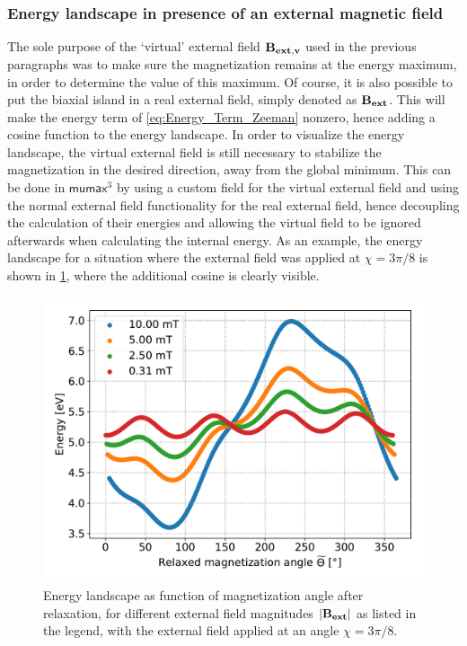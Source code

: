 \documentclass[11pt,a4paper,english]{article}
\newcommand{\mumax}{$\mathsf{mumax}^3$}
\begin{document}
\subsubsection{Energy landscape in presence of an external magnetic field}
The sole purpose of the `virtual' external field $\vb{B_{ext,v}}$ used in the previous paragraphs was to make sure the magnetization remains at the energy maximum, in order to determine the value of this maximum. Of course, it is also possible to put the biaxial island in a real external field, simply denoted as $\vb{B_{ext}}$. This will make the energy term of \cref{eq:Energy_Term_Zeeman} nonzero, hence adding a cosine function to the energy landscape. In order to visualize the energy landscape, the virtual external field is still necessary to stabilize the magnetization in the desired direction, away from the global minimum. This can be done in \mumax{} by using a custom field for the virtual external field and using the normal external field functionality for the real external field, hence decoupling the calculation of their energies and allowing the virtual field to be ignored afterwards when calculating the internal energy. As an example, the energy landscape for a situation where the external field was applied at $\chi=3\pi/8$ is shown in \cref{fig:barrierLandscape_extField}, where the additional cosine is clearly visible.
\begin{figure}
    \centering
    \includegraphics[width=0.9\columnwidth]{Figures/biaxial_island/BarrierLandscape/Ext_K0.1Ms2_Bext1e-2-1e-4_a3Pi8.pdf}
    \caption{Energy landscape as function of magnetization angle after relaxation, for different external field magnitudes $\abs{\vb{B_{ext}}}$ as listed in the legend, with the external field applied at an angle $\chi=3\pi/8$.}
    \label{fig:barrierLandscape_extField}
\end{figure}
\end{document}
